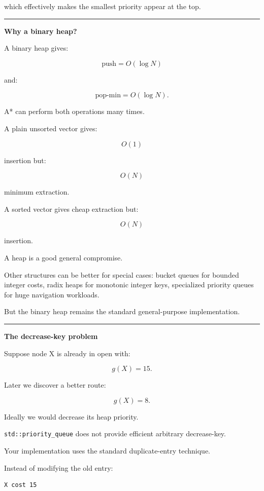 which effectively makes the smallest priority appear at the top.

\begin{center}\rule{0.5\linewidth}{0.5pt}\end{center}

\textbf{Why a binary heap?}

A binary heap gives:

\[
\text{push}=O(\log N)
\]

and:

\[
\text{pop-min}=O(\log N).
\]

A* can perform both operations many times.

A plain unsorted vector gives:

\[
O(1)
\]

insertion but:

\[
O(N)
\]

minimum extraction.

A sorted vector gives cheap extraction but:

\[
O(N)
\]

insertion.

A heap is a good general compromise.

Other structures can be better for special cases: bucket queues for bounded integer costs, radix heaps for monotonic integer keys, specialized priority queues for huge navigation workloads.

But the binary heap remains the standard general-purpose implementation.

\begin{center}\rule{0.5\linewidth}{0.5pt}\end{center}

\textbf{The decrease-key problem}

Suppose node X is already in open with:

\[
g(X)=15.
\]

Later we discover a better route:

\[
g(X)=8.
\]

Ideally we would decrease its heap priority.

\texttt{std::priority\_queue} does not provide efficient arbitrary decrease-key.

Your implementation uses the standard duplicate-entry technique.

Instead of modifying the old entry:

\begin{verbatim}
X cost 15
\end{verbatim}

